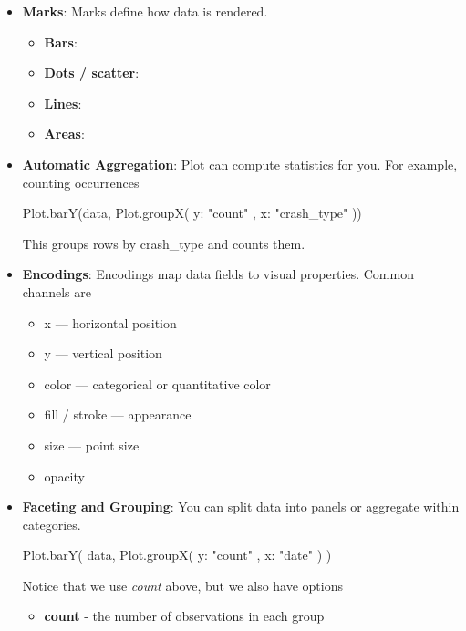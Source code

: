\documentclass{report}
\begin{document}
\begin{itemize}
\begin{jscode}
                document.body.append(plot);
            \end{jscode}
        \item \textbf{Marks}: Marks define how data is rendered.
            \begin{itemize}
                \item \textbf{Bars}: 
                \item \textbf{Dots / scatter}: 
                \item \textbf{Lines}:
                \item \textbf{Areas}:
            \end{itemize}
        \item \textbf{Automatic Aggregation}: Plot can compute statistics for you. For example, counting occurrences
            \bigbreak \noindent 
            \begin{jscode}
            Plot.barY(data, Plot.groupX({ y: "count" }, { x: "crash_type" }))
            \end{jscode}
            \bigbreak \noindent 
            This groups rows by crash\_type and counts them.
        \item \textbf{Encodings}: Encodings map data fields to visual properties. Common channels are 
            \begin{itemize}
                \item x — horizontal position
                \item y — vertical position
                \item color — categorical or quantitative color
                \item fill / stroke — appearance
                \item size — point size
                \item opacity
            \end{itemize}
        \item \textbf{Faceting and Grouping}: You can split data into panels or aggregate within categories.
            \bigbreak \noindent 
            \begin{jscode}
                Plot.barY(
                    data,
                    Plot.groupX({ y: "count" }, { x: "date" })
                )
            \end{jscode}
            \bigbreak \noindent 
            Notice that we use \textit{count} above, but we also have options
            \begin{itemize}
                \item \textbf{count} - the number of observations in each group

\end{itemize}
\end{itemize}
\end{document}
